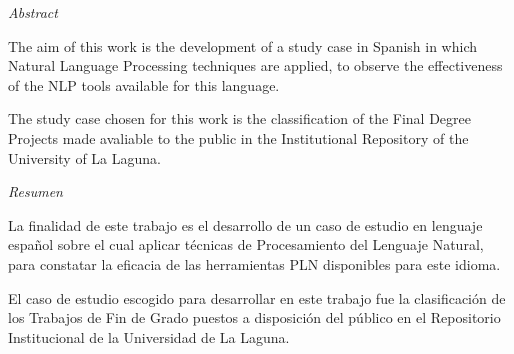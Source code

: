 
\bigskip
\begin{center}
\huge{\textit{Abstract}} \par
\end{center}


The aim of this work is the development of a study case in Spanish in which Natural Language Processing techniques are applied, to observe the effectiveness of the NLP tools available for this language.

The study case chosen for this work is the classification of the Final Degree Projects made avaliable to the public in the Institutional Repository of the University of La Laguna.

\clearpage
{}
\begin{center}
\huge{\textit{Resumen}} \par
\end{center}


La finalidad de este trabajo es el desarrollo de un caso de estudio en lenguaje español sobre el cual aplicar técnicas de Procesamiento del Lenguaje Natural, para constatar la eficacia de las herramientas PLN disponibles para este idioma.

El caso de estudio escogido para desarrollar en este trabajo fue la clasificación de los Trabajos de Fin de Grado puestos a disposición del público en el Repositorio Institucional de la Universidad de La Laguna.


\clearpage  %
